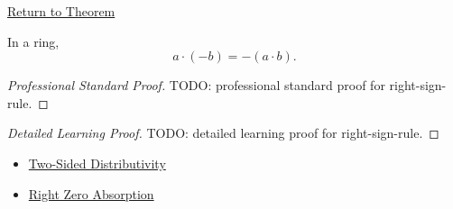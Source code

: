 \newpage
{}
\label{prf:right-sign-rule}

\begin{remark*}[Return]
\hyperref[prop:right-sign-rule]{Return to Theorem}
\end{remark*}

\begin{proposition*}
In a ring,
\[
a\cdot(-b)=-(a\cdot b).
\]
\end{proposition*}

\begin{proof}[Professional Standard Proof]
\LRAProofBodyStart
TODO: professional standard proof for right-sign-rule.
\end{proof}

\begin{proof}[Detailed Learning Proof]
\LRAProofBodyStart
TODO: detailed learning proof for right-sign-rule.
\end{proof}

\begin{remark*}
\end{remark*}

\begin{dependencies}
\begin{itemize}
  \item \hyperref[def:two-sided-distributivity]{Two-Sided Distributivity}
  \item \hyperref[prop:right-zero-absorption]{Right Zero Absorption}
\end{itemize}
\end{dependencies}

\clearpage
